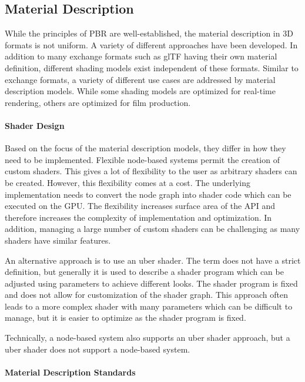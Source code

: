 \subsection{Material Description}

While the principles of \gls{PBR} are well-established, the material description in 3D formats is not uniform. A variety of different approaches have been developed. In addition to many exchange formats such as \gls{glTF} having their own material definition, different shading models exist independent of these formats. Similar to exchange formats, a variety of different use cases are addressed by material description models. While some shading models are optimized for real-time rendering, others are optimized for film production.

\paragraph{Shader Design}

Based on the focus of the material description models, they differ in how they need to be implemented. Flexible node-based systems permit the creation of custom shaders. This gives a lot of flexibility to the user as arbitrary shaders can be created. However, this flexibility comes at a cost. The underlying implementation needs to convert the node graph into shader code which can be executed on the \gls{GPU}. The flexibility increases surface area of the \gls{API} and therefore increases the complexity of implementation and optimization. In addition, managing a large number of custom shaders can be challenging as many shaders have similar features.

An alternative approach is to use an \gls{uber shader}. The term does not have a strict definition, but generally it is used to describe a shader program which can be adjusted using parameters to achieve different looks. The shader program is fixed and does not allow for customization of the shader graph. This approach often leads to a more complex shader with many parameters which can be difficult to manage, but it is easier to optimize as the shader program is fixed.

Technically, a node-based system also supports an \gls{uber shader} approach, but a \gls{uber shader} does not support a node-based system.

\paragraph{Material Description Standards}
\label{ch:materialDescriptionStandards}

